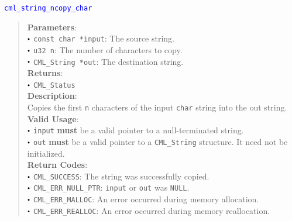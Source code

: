 \documentclass[a4paper,oneside,10pt]{article}
\newcommand{\function}[1]{
  \noindent\textcolor{blue}{\texttt{#1}}
  \vspace{-0.3em}
}
\renewcommand{\dot}{\raisebox{0.3ex}{\scalebox{0.6}{$\bullet$}}}
\theoremstyle{definition}
\begin{document}
\function{cml\_string\_ncopy\_char}
\begin{quote}
  \textbf{Parameters}: \\
  $\dot$ \texttt{const char *input}: The source string. \\
  $\dot$ \texttt{u32 n}: The number of characters to copy. \\
  $\dot$ \texttt{CML\_String *out}: The destination string. \\
  \textbf{Returns}: \\
  $\dot$ \texttt{CML\_Status} \\

  \vspace{-0.75em}
  \textbf{Description}: \\
  Copies the first \texttt{n} characters of the input \texttt{char} string into the out string. \\

  \vspace{-0.75em}
  \textbf{Valid Usage}: \\
  $\dot$ \texttt{input} \textbf{must} be a valid pointer to a null-terminated string. \\
  $\dot$ \texttt{out} \textbf{must} be a valid pointer to a \texttt{CML\_String} structure. It need not be initialized. \\

  \vspace{-0.75em}
  \textbf{Return Codes}: \\
  $\dot$ \texttt{CML\_SUCCESS}: The string was successfully copied. \\
  $\dot$ \texttt{CML\_ERR\_NULL\_PTR}: \texttt{input} or \texttt{out} was \texttt{NULL}. \\
  $\dot$ \texttt{CML\_ERR\_MALLOC}: An error occurred during memory allocation. \\
  $\dot$ \texttt{CML\_ERR\_REALLOC}: An error occurred during memory reallocation. \\
\end{quote}
\end{document}
